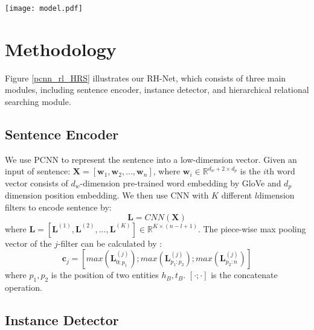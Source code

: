 \documentclass{article}
\begin{document}
\begin{figure*}[htbp]
\centerline{\texttt{[image: model.pdf]}}
\caption{The architecture of our proposed RH-Net. The left is the instance detector, which aims to select high-quality data-driven by RL. The right is the hierarchical relational searching module, which views relation extraction as a top-to-down search processing.}
\label{pcnn_rl_HRS}
\end{figure*}


\section{Methodology}

Figure \ref{pcnn_rl_HRS} illustrates our RH-Net, which consists of three main modules, including sentence encoder, instance detector, and hierarchical relational searching module.





\subsection{Sentence Encoder}

We use PCNN \cite{Zeng2015Distant} to represent the sentence into a low-dimension vector. Given an input of sentence: $\mathbf{X} = [\mathbf{w}_1, \mathbf{w}_2, ..., \mathbf{w}_n]$, where $\mathbf{w}_i\in\mathbb{R}^{d_w+2 \times d_p}$ is the $i$th word vector consists of $d_w$-dimension pre-trained word embedding by GloVe \cite{pennington2014glove} and $d_p$dimension position embedding. We then use CNN with $K$ different $l$dimension filters to encode sentence by:
\begin{equation}
\mathbf{L} = CNN(\mathbf{X})
\label{eq1}
\end{equation}
where $\mathbf{L}=[\mathbf{L}^{(1)}, \mathbf{L}^{(2)}, ..., \mathbf{L}^{(K)}]\in\mathbb{R}^{K\times(n-l+1)}$. The piece-wise max pooling vector of the $j$-filter can be calculated by :
\begin{equation}
\mathbf{c}_j = [max(\mathbf{L}_{0:p_1}^{(j)}); max(\mathbf{L}_{p_1:p_2}^{(j)}); max(\mathbf{L}_{p_2:n}^{(j)})]
\label{eq2}
\end{equation}
where $p_1, p_2$ is the position of two entities $h_B,t_B$. $[\cdot;\cdot]$ is the concatenate operation.





\subsection{Instance Detector}
\end{document}
